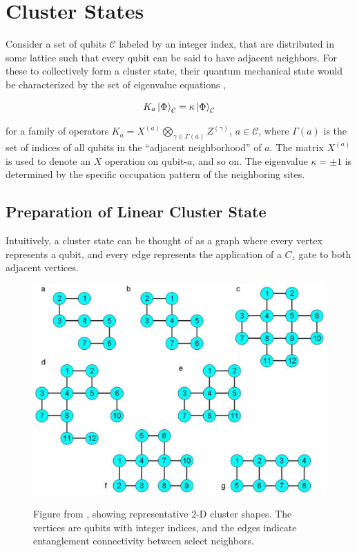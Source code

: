 \documentclass[twocolumn]{Styles/IEEEtran11}
\begin{document}
\section{Cluster States}
Consider a set of qubits $\mathcal{C}$ labeled by an integer index, that are distributed in some lattice such that every qubit can be said to have adjacent neighbors. For these to collectively form a cluster state, their quantum mechanical state would be characterized by the set of eigenvalue equations \cite{briegel2001persistent},

\begin{equation}
  K_a\left|\mspace{0.5mu} \Phi \mspace{0.5mu}\right\rangle_{\mathcal{C}}= \kappa\left|\mspace{0.5mu} \Phi \mspace{0.5mu}\right\rangle_{\mathcal{C}}
\end{equation}

\noindent for a family of operators $K_a = X^{(a)}\bigotimes_{\gamma\in\Gamma(a)}Z^{(\gamma)}$, $a\in\mathcal{C}$, where $\Gamma(a)$ is the set of indices of all qubits in the ``adjacent neighborhood'' of $a$. The matrix $X^{(a)}$ is used to denote an $X$ operation on qubit-$a$, and so on. The eigenvalue $\kappa = \pm 1$ is determined by the specific occupation pattern of the neighboring sites. 

\subsection{Preparation of Linear Cluster State}


Intuitively, a cluster state can be thought of as a graph
where every vertex represents a qubit, and every edge represents the
application of a $C_z$ gate to both adjacent vertices.

\begin{figure}[thb]
  \centering
  \includegraphics[width=0.9\linewidth]{Images/2d_clusters_rep.jpg}
  \label{I2dclustersfig}
  \caption{Figure from \protect\cite{gerald2006efficient}, showing representative 2-D cluster shapes. The vertices are qubits with integer indices, and the edges indicate entanglement connectivity between select neighbors.}
\end{figure}
\end{document}
